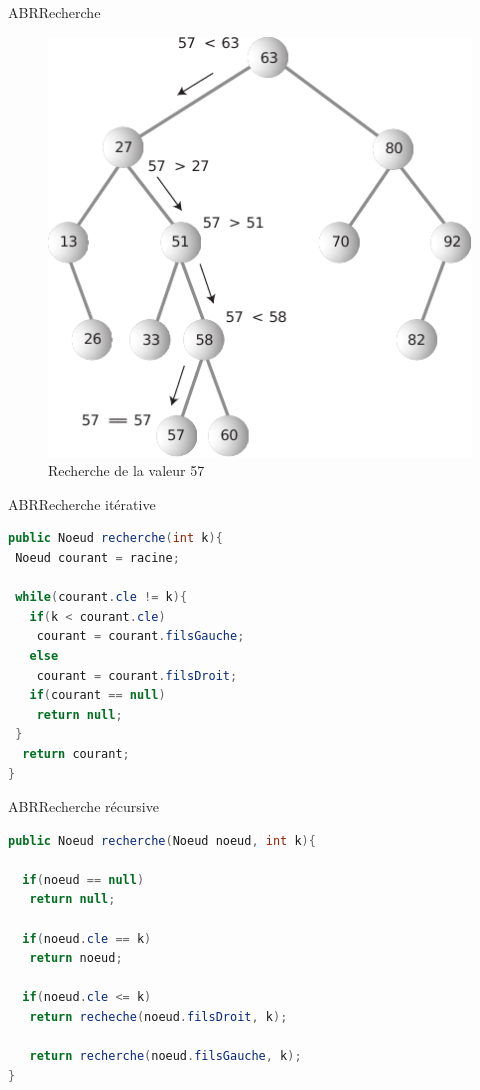 \documentclass[12pt,a4paper]{beamer}
\begin{document}
\begin{frame}{ABR}{Recherche}
\begin{figure}
\includegraphics[scale=0.8]{figs/search_abr}
\caption{Recherche de la valeur 57}
\end{figure}
\end{frame}

\begin{frame}[fragile]{ABR}{Recherche itérative}

\begin{lstlisting}[language=Java]
public Noeud recherche(int k){
 Noeud courant = racine;

 while(courant.cle != k){
   if(k < courant.cle)
    courant = courant.filsGauche;
   else
    courant = courant.filsDroit;
   if(courant == null)
    return null;
 }
  return courant;
}

\end{lstlisting}
\end{frame}


\begin{frame}[fragile]{ABR}{Recherche récursive}
\begin{lstlisting}[language=Java]
public Noeud recherche(Noeud noeud, int k){

  if(noeud == null)
   return null;
  
  if(noeud.cle == k)
   return noeud;
  
  if(noeud.cle <= k)
   return recheche(noeud.filsDroit, k);
   
   return recherche(noeud.filsGauche, k);
}
\end{lstlisting}
\end{frame}
\end{document}
